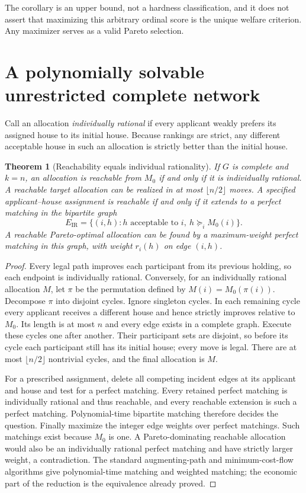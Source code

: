 \documentclass[11pt,a4paper]{article}
\newtheorem{theorem}{Theorem}[section]
\theoremstyle{definition}
\theoremstyle{remark}
\begin{document}
The corollary is an upper bound, not a hardness classification, and it does not assert that maximizing this arbitrary ordinal score is the unique welfare criterion. Any maximizer serves as a valid Pareto selection.

\section{A polynomially solvable unrestricted complete network}
Call an allocation \emph{individually rational} if every applicant weakly prefers its assigned house to its initial house. Because rankings are strict, any different acceptable house in such an allocation is strictly better than the initial house.

\begin{theorem}[Reachability equals individual rationality]\label{th:complete}
If $G$ is complete and $k=n$, an allocation is reachable from $M_0$ if and only if it is individually rational. A reachable target allocation can be realized in at most $\lfloor n/2\rfloor$ moves. A specified applicant--house assignment is reachable if and only if it extends to a perfect matching in the bipartite graph
\[
 E_{\mathrm{IR}}=\{(i,h):h\text{ acceptable to }i,\ h\succeq_i M_0(i)\}.
\]
A reachable Pareto-optimal allocation can be found by a maximum-weight perfect matching in this graph, with weight $r_i(h)$ on edge $(i,h)$.
\end{theorem}
\begin{proof}
Every legal path improves each participant from its previous holding, so each endpoint is individually rational. Conversely, for an individually rational allocation $M$, let $\pi$ be the permutation defined by $M(i)=M_0(\pi(i))$. Decompose $\pi$ into disjoint cycles. Ignore singleton cycles. In each remaining cycle every applicant receives a different house and hence strictly improves relative to $M_0$. Its length is at most $n$ and every edge exists in a complete graph. Execute these cycles one after another. Their participant sets are disjoint, so before its cycle each participant still has its initial house; every move is legal. There are at most $\lfloor n/2\rfloor$ nontrivial cycles, and the final allocation is $M$.

For a prescribed assignment, delete all competing incident edges at its applicant and house and test for a perfect matching. Every retained perfect matching is individually rational and thus reachable, and every reachable extension is such a perfect matching. Polynomial-time bipartite matching therefore decides the question. Finally maximize the integer edge weights over perfect matchings. Such matchings exist because $M_0$ is one. A Pareto-dominating reachable allocation would also be an individually rational perfect matching and have strictly larger weight, a contradiction. The standard augmenting-path and minimum-cost-flow algorithms give polynomial-time matching and weighted matching; the economic part of the reduction is the equivalence already proved.
\end{proof}
\end{document}
